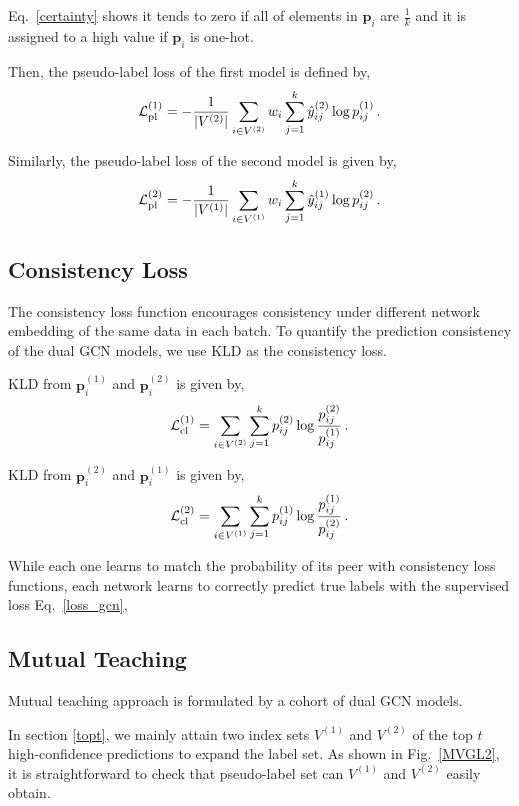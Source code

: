 \documentclass{article}
\begin{document}
Eq.~\eqref{certainty} shows it tends to zero if all of elements in $\bm{p}_i$ are $\frac{1}{k}$ and it is assigned to a high value if $\bm{p}_i$ is one-hot.

Then, the pseudo-label loss of the first model is defined by,
\begin{equation}\label{loss_pl1}
\mathcal{L}_{\rm pl}^{(1)}=-\frac{1}{|V^{(2)}|}\sum_{i\in V^{(2)}}w_i\sum_{j=1}^k \hat{y}_{ij}^{(2)}\log p^{(1)}_{ij}\,.
\end{equation}

Similarly, the pseudo-label loss of the second model is given by,
\begin{equation}\label{loss_pl2}
\mathcal{L}_{\rm pl}^{(2)}=-\frac{1}{|V^{(1)}|}\sum_{i\in V^{(1)}}w_i\sum_{j=1}^k \hat{y}_{ij}^{(1)}\log p^{(2)}_{ij}\,.
\end{equation}
\subsection{Consistency Loss}
The consistency loss function encourages consistency under different network embedding of the same data in each batch. To quantify the prediction consistency of the dual GCN models, we use KLD as the consistency loss.

KLD from ${\bm p}^{(1)}_i$ and $\bm{p}^{(2)}_i$ is given by,
\begin{equation}\label{loss_cl1}
\mathcal{L}_{\rm cl}^{(1)}=\sum_{i\in V^{(2)}}\sum_{j=1}^k p^{(2)}_{ij}\log\frac{p^{(2)}_{ij}}{p^{(1)}_{ij}}\,.
\end{equation}

KLD from ${\bm p}^{(2)}_i$ and $\bm{p}^{(1)}_i$ is given by,
\begin{equation}\label{loss_cl1}
\mathcal{L}_{\rm cl}^{(2)}=\sum_{i\in V^{(1)}}\sum_{j=1}^k p^{(1)}_{ij}\log\frac{p^{(1)}_{ij}}{p^{(2)}_{ij}}\,.
\end{equation}

While each one learns to match the probability of its peer with consistency loss functions, each network learns to correctly predict true labels with the supervised loss Eq.~\eqref{loss_gcn},
\subsection{Mutual Teaching}
Mutual teaching approach is formulated by a cohort of dual GCN models.

In section \ref{topt}, we mainly attain two index sets $V^{(1)}$ and $V^{(2)}$ of the top $t$ high-confidence predictions to expand the label set. As shown in Fig.~\ref{MVGL2}, it is straightforward to check that pseudo-label set can  $V^{(1)}$ and $V^{(2)}$ easily obtain.
\end{document}

